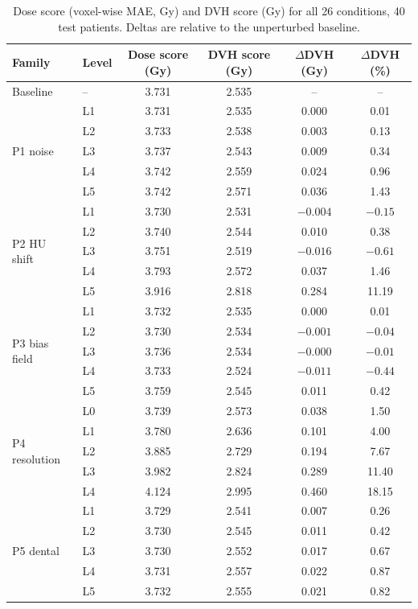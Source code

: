 \documentclass[11pt]{article}
\begin{document}
\begin{table}[t]
\centering
\caption{Dose score (voxel-wise MAE, Gy) and DVH score (Gy) for all 26
conditions, 40 test patients. Deltas are relative to the unperturbed
baseline.}
\label{tab:aggregate}
\small
\begin{tabular}{llcccc}
\toprule
Family & Level & Dose score (Gy) & DVH score (Gy) & $\Delta$DVH (Gy) & $\Delta$DVH (\%) \\
\midrule
Baseline & -- & 3.731 & 2.535 & -- & -- \\
\midrule
\multirow{5}{*}{P1 noise}
 & L1 & 3.731 & 2.535 & 0.000 & 0.01 \\
 & L2 & 3.733 & 2.538 & 0.003 & 0.13 \\
 & L3 & 3.737 & 2.543 & 0.009 & 0.34 \\
 & L4 & 3.742 & 2.559 & 0.024 & 0.96 \\
 & L5 & 3.742 & 2.571 & 0.036 & 1.43 \\
\midrule
\multirow{5}{*}{P2 HU shift}
 & L1 & 3.730 & 2.531 & $-0.004$ & $-0.15$ \\
 & L2 & 3.740 & 2.544 & 0.010 & 0.38 \\
 & L3 & 3.751 & 2.519 & $-0.016$ & $-0.61$ \\
 & L4 & 3.793 & 2.572 & 0.037 & 1.46 \\
 & L5 & 3.916 & 2.818 & 0.284 & 11.19 \\
\midrule
\multirow{5}{*}{P3 bias field}
 & L1 & 3.732 & 2.535 & 0.000 & 0.01 \\
 & L2 & 3.730 & 2.534 & $-0.001$ & $-0.04$ \\
 & L3 & 3.736 & 2.534 & $-0.000$ & $-0.01$ \\
 & L4 & 3.733 & 2.524 & $-0.011$ & $-0.44$ \\
 & L5 & 3.759 & 2.545 & 0.011 & 0.42 \\
\midrule
\multirow{5}{*}{P4 resolution}
 & L0 & 3.739 & 2.573 & 0.038 & 1.50 \\
 & L1 & 3.780 & 2.636 & 0.101 & 4.00 \\
 & L2 & 3.885 & 2.729 & 0.194 & 7.67 \\
 & L3 & 3.982 & 2.824 & 0.289 & 11.40 \\
 & L4 & 4.124 & 2.995 & 0.460 & 18.15 \\
\midrule
\multirow{5}{*}{P5 dental}
 & L1 & 3.729 & 2.541 & 0.007 & 0.26 \\
 & L2 & 3.730 & 2.545 & 0.011 & 0.42 \\
 & L3 & 3.730 & 2.552 & 0.017 & 0.67 \\
 & L4 & 3.731 & 2.557 & 0.022 & 0.87 \\
 & L5 & 3.732 & 2.555 & 0.021 & 0.82 \\
\bottomrule
\end{tabular}
\end{table}
\end{document}
